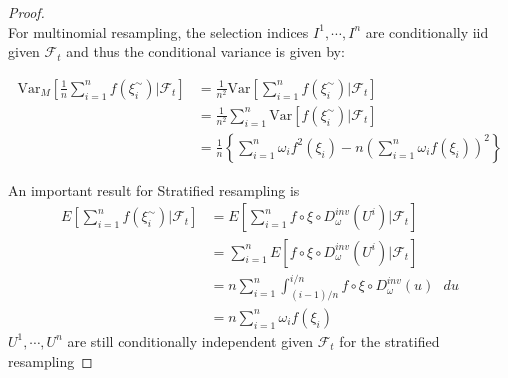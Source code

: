 \documentclass[11pt,a4,twosided,singlespacing,titlepagenumber=on]{scrreprt}
\numberwithin{equation}{chapter} %
\theoremstyle{remark}
\begin{document}
\begin{proof}
\cite{douc2005} \\
For multinomial resampling, the selection indices $I^1,\cdots,I^n$ are conditionally iid given $\mathcal{F}_t$ and thus the conditional variance is given by:

\begin{align*}
\text{Var}_M \left[ \frac{1}{n} \sum_{i=1}^n f(\xi_i^\sim) \bigg| \mathcal{F}_t \right] &= \frac{1}{n^2} \text{Var} \left[ \sum_{i=1}^n f(\xi_i^\sim) \bigg| \mathcal{F}_t \right] \\
																					  &= \frac{1}{n^2} \sum_{i=1}^n \text{Var} \left[ f(\xi_i^\sim) \bigg| \mathcal{F}_t \right] \\
																					  &= \frac{1}{n} \left\{\sum_{i=1}^n \omega_i f^2(\xi_i) - n \left(\sum_{i=1}^n \omega_i f(\xi_i)\right)^2\right\}
\end{align*}

An important result for Stratified resampling is
\begin{align*}
E \left[ \sum_{i=1}^n f(\xi_i^\sim)  \bigg| \mathcal{F}_t \right] &= E \left[ \sum_{i=1}^n f \circ \xi \circ D_\omega^{inv}(U^i) \bigg| \mathcal{F}_t \right] \\
																  &= \sum_{i=1}^n E \left[ f \circ \xi \circ D_\omega^{inv}(U^i) \bigg| \mathcal{F}_t \right] \\
																  &= n \sum_{i=1}^n \int_{(i-1)/n}^{i/n} f \circ \xi \circ D_\omega^{inv}(u)\text{ }du \\
																  &= n \sum_{i=1}^n \omega_i f(\xi_i)
\end{align*}
$U^1,\cdots,U^n$ are still conditionally independent given $\mathcal{F}_t$ for the stratified resampling



\end{proof}
\end{document}
